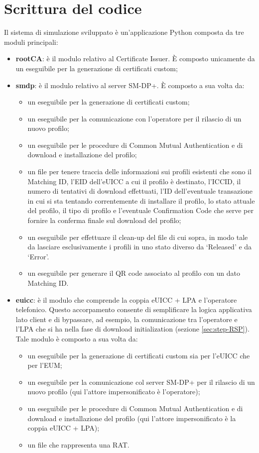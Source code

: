 \documentclass[10pt, oneside]{book}
\begin{document}
\section{Scrittura del codice}
Il sistema di simulazione sviluppato è un'applicazione Python composta da tre moduli principali:
\begin{itemize}
\item \textbf{rootCA}: è il modulo relativo al Certificate Issuer. È composto unicamente da un eseguibile per la generazione di certificati custom;
\item \textbf{smdp}: è il modulo relativo al server SM-DP+. È composto a sua volta da:
\begin{itemize}
\item un eseguibile per la generazione di certificati custom;
\item un eseguibile per la comunicazione con l'operatore per il rilascio di un nuovo profilo;
\item un eseguibile per le procedure di Common Mutual Authentication e di download e installazione del profilo;
\item un file per tenere traccia delle informazioni sui profili esistenti che sono il Matching ID, l'EID dell'eUICC a cui il profilo è destinato, l'ICCID, il numero di tentativi di download effettuati, l'ID dell'eventuale transazione in cui si sta tentando correntemente di installare il profilo, lo stato attuale del profilo, il tipo di profilo e l'eventuale Confirmation Code che serve per fornire la conferma finale sul download del profilo;
\item un eseguibile per effettuare il clean-up del file di cui sopra, in modo tale da lasciare esclusivamente i profili in uno stato diverso da `Released' e da `Error'.
\item un eseguibile per generare il QR code associato al profilo con un dato Matching ID.
\end{itemize}
\item \textbf{euicc}: è il modulo che comprende la coppia eUICC + LPA e l'operatore telefonico. Questo accorpamento consente di semplificare la logica applicativa lato client e di bypassare, ad esempio, la comunicazione tra l'operatore e l'LPA che si ha nella fase di download initialization (sezione \ref{sec:step-RSP}). Tale modulo è composto a sua volta da:
\begin{itemize}
\item un eseguibile per la generazione di certificati custom sia per l'eUICC che per l'EUM;
\item un eseguibile per la comunicazione col server SM-DP+ per il rilascio di un nuovo profilo (qui l'attore impersonificato è l'operatore);
\item un eseguibile per le procedure di Common Mutual Authentication e di download e installazione del profilo (qui l'attore impersonificato è la coppia eUICC + LPA);
\item un file che rappresenta una RAT.
\end{itemize}
\end{itemize}
\end{document}
